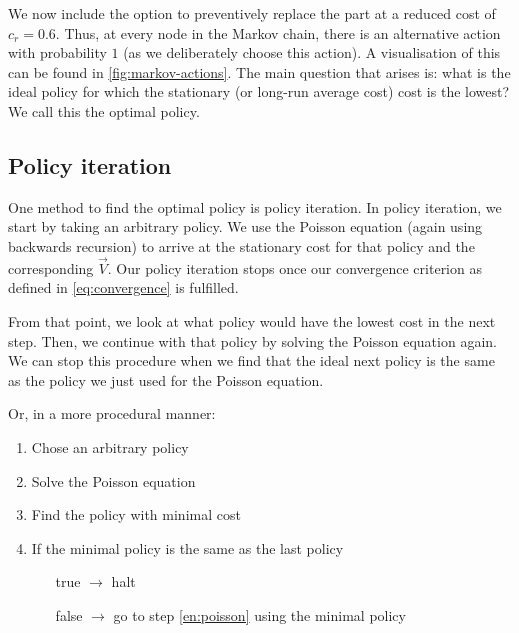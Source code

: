 \documentclass{uniarticle}
\begin{document}
We now include the option to preventively replace the part at a reduced cost of
$c_r = 0.6$. Thus, at every node in the Markov chain, there is an alternative action
with probability $1$ (as we deliberately choose this action). A visualisation of
this can be found in \cref{fig:markov-actions}. The main question that arises
is:
what is the ideal policy for which the stationary (or long-run average cost) cost
is the lowest? We call this the optimal policy.

%     

\subsection{Policy iteration}

One method to find the optimal policy is policy iteration. In policy
iteration, we start by taking an arbitrary policy. We use the Poisson equation
(again using backwards recursion) to arrive at the stationary cost for that
policy and the corresponding $\vec{V}$. Our policy iteration stops once our
convergence criterion as defined in \cref{eq:convergence} is fulfilled.

From that point, we look at what policy would have the lowest cost in the next
step. Then, we continue with that policy by solving the Poisson equation again.
We can stop this procedure when we find that the ideal next policy is the same
as the policy we just used for the Poisson equation.

Or, in a more procedural manner:

\begin{enumerate}
    \setlength{\itemsep}{0pt}
    \setlength{\parskip}{0pt}
    \item Chose an arbitrary policy
    \item \label{en:poisson} Solve the Poisson equation
    \item Find the policy with minimal cost
    \item If the minimal policy is the same as the last policy
        \begin{enumerate}
            \item[true] $\rightarrow$ halt
            \item[false] $\rightarrow$ go to step \ref{en:poisson} using the minimal policy
        \end{enumerate}
\end{enumerate}
\end{document}
